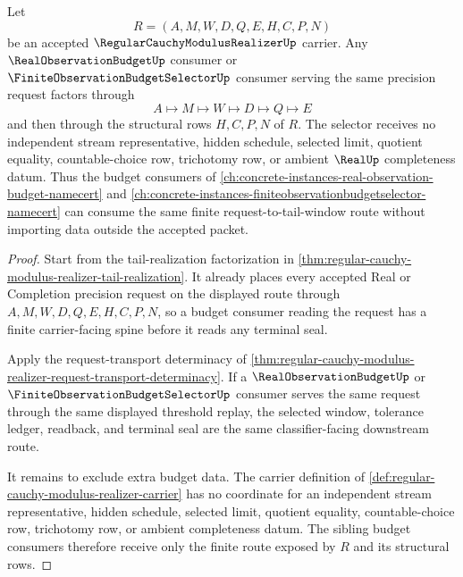 \begin{theorem}
\label{thm:regular-cauchy-modulus-realizer-selector-budget-exhaustion}
Let
$$
R=(A,M,W,D,Q,E,H,C,P,N)
$$
be an accepted $\RegularCauchyModulusRealizerUp$ carrier. Any $\RealObservationBudgetUp$ consumer or $\FiniteObservationBudgetSelectorUp$ consumer serving the same precision request factors through
$$
A\longmapsto M\longmapsto W\longmapsto D\longmapsto Q\longmapsto E
$$
and then through the structural rows $H,C,P,N$ of $R$. The selector receives no independent stream representative, hidden schedule, selected limit, quotient equality, countable-choice row, trichotomy row, or ambient $\RealUp$ completeness datum. Thus the budget consumers of \autoref{ch:concrete-instances-real-observation-budget-namecert} and \autoref{ch:concrete-instances-finiteobservationbudgetselector-namecert} can consume the same finite request-to-tail-window route without importing data outside the accepted packet.
\end{theorem}
\begin{proof}
Start from the tail-realization factorization in \autoref{thm:regular-cauchy-modulus-realizer-tail-realization}. It already places every accepted Real or Completion precision request on the displayed route through $A,M,W,D,Q,E,H,C,P,N$, so a budget consumer reading the request has a finite carrier-facing spine before it reads any terminal seal.

Apply the request-transport determinacy of \autoref{thm:regular-cauchy-modulus-realizer-request-transport-determinacy}. If a $\RealObservationBudgetUp$ or $\FiniteObservationBudgetSelectorUp$ consumer serves the same request through the same displayed threshold replay, the selected window, tolerance ledger, readback, and terminal seal are the same classifier-facing downstream route.

It remains to exclude extra budget data. The carrier definition of \autoref{def:regular-cauchy-modulus-realizer-carrier} has no coordinate for an independent stream representative, hidden schedule, selected limit, quotient equality, countable-choice row, trichotomy row, or ambient completeness datum. The sibling budget consumers therefore receive only the finite route exposed by $R$ and its structural rows.
\end{proof}

